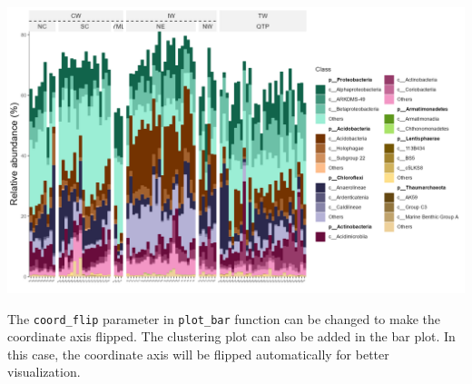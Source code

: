\documentclass[
]{book}
\begin{document}
\begin{center}\includegraphics[width=700px]{Images/trans_abund_barplot_ggnested} \end{center}

The \texttt{coord\_flip} parameter in \texttt{plot\_bar} function can be changed to make the coordinate axis flipped.
The clustering plot can also be added in the bar plot.
In this case, the coordinate axis will be flipped automatically for better visualization.
\end{document}
